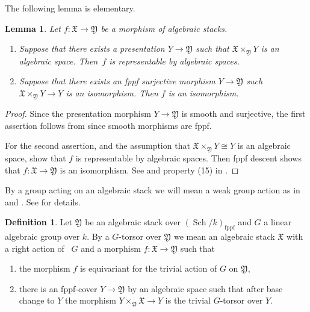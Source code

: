 \documentclass[12pt, final]{amsart}
\theoremstyle{remark}
\theoremstyle{definition}
\newtheorem{definition}[example]{Definition}
\theoremstyle{plain}
\newtheorem{lemma}[example]{Lemma}
\newcommand{\fX}{{\mathfrak X}}
\newcommand{\fY}{{\mathfrak Y}}
\DeclareMathOperator{\sch}{Sch}
\begin{document}
The following lemma is elementary. 

\begin{lemma}\label{l:isomorphism-criteria-for-stacks}
    Let $f:\fX\to\fY $ be a morphism of algebraic stacks. 
    \begin{enumerate}
        \item Suppose that there exists a presentation $Y\to \fY$ such that $\fX\times_{\fY} Y $ is an algebraic space. Then~$f$ is representable by algebraic spaces.
        \item Suppose that there exists an fppf surjective morphism $Y\to \fY$ such $\fX\times_{\fY} Y \to Y$ is an isomorphism. Then $f$ is an isomorphism.
    \end{enumerate}
\end{lemma}

\begin{proof}
    Since the presentation morphism $Y\to \fY$ is smooth and surjective, the first assertion follows from 
    \cite[\href{https://stacks.math.columbia.edu/tag/04ZP}{04ZP}]{stacks-project} since smooth morphisms are fppf.
    
    For the second assertion, \cite[\href{https://stacks.math.columbia.edu/tag/04ZP}{04ZP}]{stacks-project} and the 
    assumption that $\fX\times_{\fY} Y\cong Y$ is an algebraic space, show that $f$ is representable by algebraic spaces.
    Then fppf descent shows that $f:\fX\to \fY$ is an isomorphism.
    See \cite[\href{https://stacks.math.columbia.edu/tag/04XD}{04XD}]{stacks-project} and property (15) in \cite[\href{https://stacks.math.columbia.edu/tag/04XB}{Section 04XB}]{stacks-project}.
\end{proof}

By a group acting on an algebraic stack we will mean a weak group action as in \cite{ginot} and \cite{romagny:05}. See  for details.

\begin{definition}\label{d:stack-torsor}
Let $\fY$ be an algebraic stack over $(\sch/k)_{\mathrm{fppf}}
$ and $G$ a linear algebraic group over $k$. By a $G$-torsor over $\fY$
we mean an algebraic stack $\fX$ with a right action of ~$G$ and a morphism $f:\fX\to \fY$ such that 
\begin{enumerate}
    \item the morphism $f$ is equivariant for the trivial action of $G$ on $\fY $, 
    \item there is an fppf-cover $Y\to \fY$ by an algebraic space such that after base change to $Y$ the morphism $Y\times_{\fY}\fX  \to Y$ is the trivial $G$-torsor over $Y$. 
\end{enumerate}    
\end{definition}
\end{document}
